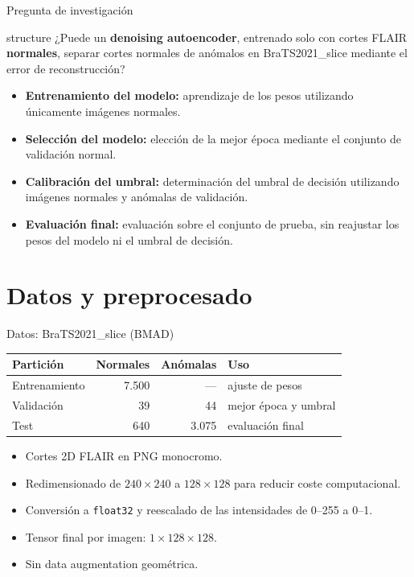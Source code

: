 \documentclass[10pt,aspectratio=169]{beamer}
\begin{document}
\begin{frame}{Pregunta de investigación}
  \begin{center}
  \begin{beamercolorbox}[rounded=true,shadow=true,sep=1em]{structure}
    \large ¿Puede un \textbf{denoising autoencoder}, entrenado solo con cortes
    FLAIR \textbf{normales}, separar cortes normales de anómalos en
    BraTS2021\_slice mediante el error de reconstrucción?
  \end{beamercolorbox}
  \end{center}

  \vspace{0.35cm}
\begin{itemize}
    \item \textbf{Entrenamiento del modelo:} aprendizaje de los pesos utilizando únicamente imágenes normales.
    \item \textbf{Selección del modelo:} elección de la mejor época mediante el conjunto de validación normal.
    \item \textbf{Calibración del umbral:} determinación del umbral de decisión utilizando imágenes normales y anómalas de validación.
    \item \textbf{Evaluación final:} evaluación sobre el conjunto de prueba, sin reajustar los pesos del modelo ni el umbral de decisión.
\end{itemize}
\end{frame}

\section{Datos y preprocesado}

\begin{frame}{Datos: BraTS2021\_slice (BMAD)}
  \begin{center}
  \begin{tabular}{lrrl}
    \toprule
    Partición & Normales & Anómalas & Uso \\
    \midrule
    Entrenamiento & 7.500 & --- & ajuste de pesos \\
    Validación & 39 & 44 & mejor época y umbral \\
    Test & 640 & 3.075 & evaluación final \\
    \bottomrule
  \end{tabular}
  \end{center}

  \vspace{0.35cm}
  \begin{itemize}
    \item Cortes 2D FLAIR en PNG monocromo.
    \item Redimensionado de $240\times240$ a $128\times128$ para reducir coste computacional.
    \item Conversión a \texttt{float32} y reescalado de las intensidades de 0--255 a 0--1.
    \item Tensor final por imagen: $1\times128\times128$.
    \item Sin data augmentation geométrica.
  \end{itemize}
\end{frame}
\end{document}
